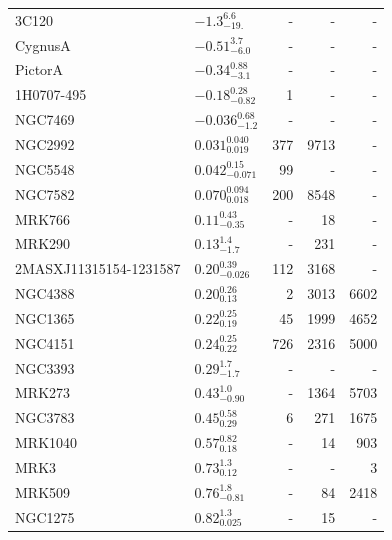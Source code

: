 \begin{longtable}{llrrr}
\endlastfoot
3C120                  &      $ -1.3_{-19.}^{6.6} $ &       - &        - &       - \\
CygnusA                &     $ -0.51_{-6.0}^{3.7} $ &       - &        - &       - \\
PictorA                &    $ -0.34_{-3.1}^{0.88} $ &       - &        - &       - \\
1H0707-495             &   $ -0.18_{-0.82}^{0.28} $ &       1 &        - &       - \\
NGC7469                &   $ -0.036_{-1.2}^{0.68} $ &       - &        - &       - \\
NGC2992                &  $ 0.031_{0.019}^{0.040} $ &     377 &     9713 &       - \\
NGC5548                &  $ 0.042_{-0.071}^{0.15} $ &      99 &        - &       - \\
NGC7582                &  $ 0.070_{0.018}^{0.094} $ &     200 &     8548 &       - \\
MRK766                 &    $ 0.11_{-0.35}^{0.43} $ &       - &       18 &       - \\
MRK290                 &      $ 0.13_{-1.7}^{1.4} $ &       - &      231 &       - \\
2MASXJ11315154-1231587 &   $ 0.20_{-0.026}^{0.39} $ &     112 &     3168 &       - \\
NGC4388                &     $ 0.20_{0.13}^{0.26} $ &       2 &     3013 &    6602 \\
NGC1365                &     $ 0.22_{0.19}^{0.25} $ &      45 &     1999 &    4652 \\
NGC4151                &     $ 0.24_{0.22}^{0.25} $ &     726 &     2316 &    5000 \\
NGC3393                &      $ 0.29_{-1.7}^{1.7} $ &       - &        - &       - \\
MRK273                 &     $ 0.43_{-0.90}^{1.0} $ &       - &     1364 &    5703 \\
NGC3783                &     $ 0.45_{0.29}^{0.58} $ &       6 &      271 &    1675 \\
MRK1040                &     $ 0.57_{0.18}^{0.82} $ &       - &       14 &     903 \\
MRK3                   &      $ 0.73_{0.12}^{1.3} $ &       - &        - &       3 \\
MRK509                 &     $ 0.76_{-0.81}^{1.8} $ &       - &       84 &    2418 \\
NGC1275                &     $ 0.82_{0.025}^{1.3} $ &       - &       15 &       - \\

\end{longtable}
